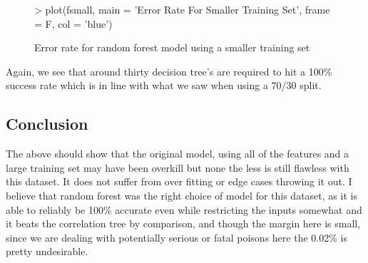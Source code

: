 \documentclass[12pt]{article}         %
\begin{document}
\pagebreak
\begin{figure}
\begin{center}
\begin{Schunk}
\begin{Sinput}
> plot(fsmall, main = 'Error Rate For Smaller Training Set', frame = F, col = 'blue')
\end{Sinput}
\end{Schunk}
\caption {Error rate for random forest model using a smaller training set}
\label{fig7}
\end {center}
\end {figure}
Again, we see that around thirty decision tree's are required to hit a 100\% success rate which is in line with what we saw when using a 70/30 split.

\subsection{Conclusion}
The above should show that the original model, using all of the features and a large training set may have been overkill but none the less is still flawless with this dataset. It does not suffer from over fitting or edge cases throwing it out. 
I believe that random forest was the right choice of model for this dataset, as it is able to reliably be 100\% accurate even while restricting the inputs somewhat and it beats the correlation tree by comparison, and though the margin here is small, since we are dealing with potentially serious or fatal poisons here the 0.02\% is pretty undesirable.
\end{document}
